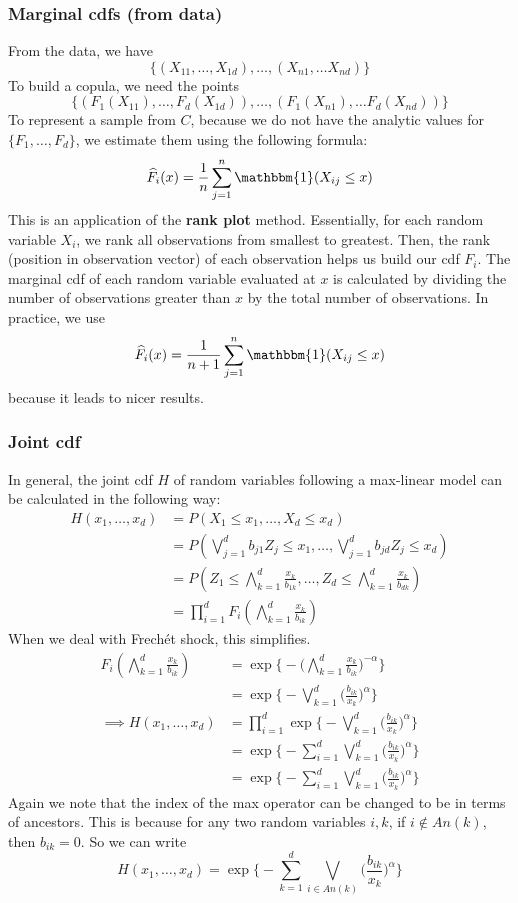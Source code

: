 \documentclass[12pt]{article}
\theoremstyle{definition}
\theoremstyle{definition}
\begin{document}
\subsubsection{Marginal cdfs (from data)}
From the data, we have $$\{(X_{11},\hdots,X_{1d}), \hdots, (X_{n1}, \hdots X_{nd})\}$$To build a copula, we need the points 
$$\{(F_1(X_{11}),\hdots,F_d(X_{1d})), \hdots, (F_1(X_{n1}), \hdots F_d(X_{nd}))\}$$
To represent a sample from $C$, because we do not have the analytic values for $\{F_1,\hdots,F_d\}$, we estimate them using the following formula:
$$\widehat{F}_i(x)=\frac{1}{n}\sum_{j=1}^n\mathbbm{1}(X_{ij}\leq x)$$
This is an application of the \textbf{rank plot} method. Essentially, for each random variable $X_{i}$, we rank all observations from smallest to greatest. Then, the rank (position in observation vector) of each observation helps us build our cdf $F_i$. The marginal cdf of each random variable evaluated at $x$ is calculated by dividing the number of observations greater than $x$ by the total number of observations. In practice, we use 
$$\widehat{F}_i(x)=\frac{1}{n+1}\sum_{j=1}^n\mathbbm{1}(X_{ij}\leq x)$$
because it leads to nicer results.
\subsubsection{Joint cdf}
In general, the joint cdf $H$ of random variables following a max-linear model can be calculated in the following way:
\begin{align*}
    H(x_1,\hdots, x_d)&=P(X_1\leq x_1,\hdots,X_d\leq x_d)\\
    &=P(\bigvee_{j=1}^db_{j1}Z_j\leq x_1, \hdots, \bigvee_{j=1}^db_{jd}Z_j\leq x_d)\\
    &=P(Z_1\leq{\bigwedge_{k=1}^d\frac{x_k}{b_{1k}}},\hdots, Z_d\leq\bigwedge_{k=1}^d\frac{x_k}{b_{dk}})\\
    &=\prod_{i=1}^dF_i(\bigwedge_{k=1}^d\frac{x_k}{b_{ik}})
\end{align*}
When we deal with Frechét shock, this simplifies.
\begin{align*}
    F_i(\bigwedge_{k=1}^d\frac{x_k}{b_{ik}})&=\exp\bigg\{-\bigg(\bigwedge_{k=1}^d\frac{x_k}{b_{ik}}\bigg)^{-\alpha}\bigg\}\\
    &=\exp\bigg\{-\bigvee_{k=1}^d \bigg( \frac{b_{ik}}{x_k} \bigg)^\alpha\bigg\}\\
    \implies H(x_1,\hdots, x_d)&=\prod_{i=1}^d\exp\bigg\{-\bigvee_{k=1}^d \bigg( \frac{b_{ik}}{x_k} \bigg)^\alpha\bigg\}\\
    &=\exp\bigg\{ -\sum_{i=1}^d \bigvee_{k=1}^d \bigg( \frac{b_{ik}}{x_k} \bigg)^\alpha \bigg\}\\
    &=\exp\bigg\{ -\sum_{i=1}^d \bigvee_{k=1}^d \bigg( \frac{b_{ik}}{x_k} \bigg)^\alpha \bigg\}
\end{align*}
Again we note that the index of the max operator can be changed to be in terms of ancestors. This is because for any two random variables $i,k$, if $i \notin An(k)$, then $b_{ik}=0$. So we can write 
$$H(x_1,\hdots,x_d)=\exp\bigg\{ -\sum_{k=1}^d  \bigvee_{i\in An(k)}\bigg( \frac{b_{ik}}{x_k} \bigg)^\alpha \bigg\}$$
\end{document}
